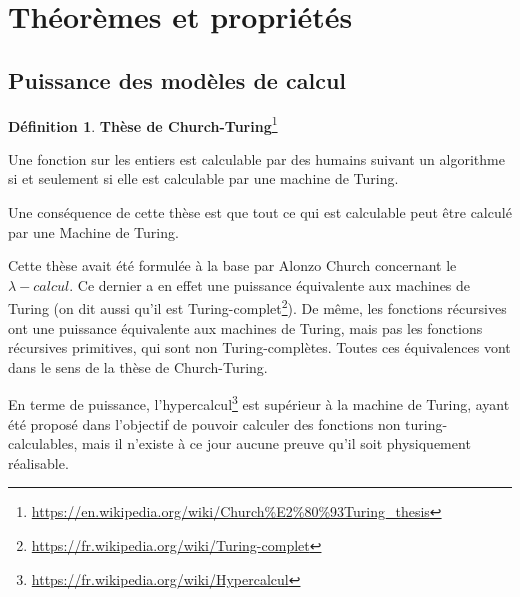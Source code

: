 \documentclass{book}
\theoremstyle{definition}
\newtheorem{definition}{Définition}
\numberwithin{lemma}{subsection}
\numberwithin{theorem}{subsection}
\numberwithin{definition}{subsection}
\numberwithin{proposition}{subsection}
\numberwithin{corollary}{subsection}
\numberwithin{property}{subsection}
\numberwithin{example}{subsection}
\numberwithin{heuristique}{subsection}
\numberwithin{scenario}{subsection}
\begin{document}
    \section{Théorèmes et propriétés}
        \subsection{Puissance des modèles de calcul}
            \begin{definition}\textbf{Thèse de Church-Turing}\footnote{\url{https://en.wikipedia.org/wiki/Church\%E2\%80\%93Turing\_thesis}}
                \par Une fonction sur les entiers est calculable par des humains suivant un algorithme si et seulement si elle est calculable par une machine de Turing.
            \end{definition}
            Une conséquence de cette thèse est que tout ce qui est calculable peut être calculé par une Machine de Turing.
            \par Cette thèse avait été formulée à la base par Alonzo Church concernant le $\lambda-calcul$. Ce dernier a en effet une puissance équivalente aux machines de Turing (on dit aussi qu'il est Turing-complet\footnote{\url{https://fr.wikipedia.org/wiki/Turing-complet}}).
            De même, les fonctions récursives ont une puissance équivalente aux machines de Turing, mais pas les fonctions récursives primitives, qui sont non Turing-complètes.
            Toutes ces équivalences vont dans le sens de la thèse de Church-Turing.
            \par En terme de puissance, l'hypercalcul\footnote{\url{https://fr.wikipedia.org/wiki/Hypercalcul}} est supérieur à la machine de Turing, ayant été proposé dans l'objectif de pouvoir calculer des fonctions non turing-calculables, mais il n'existe à ce jour aucune preuve qu'il soit physiquement réalisable.
        
\end{document}
